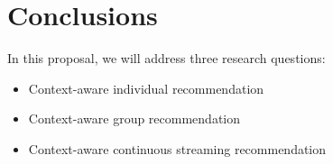 \section{Conclusions}
\begin{frame}{\insertsection}
	In this proposal, we will address three research questions:
	\vspace{1em}
	\begin{itemize}
		\setlength\itemsep{1em}
		\item Context-aware individual recommendation
		\item Context-aware group recommendation
		\item Context-aware continuous streaming recommendation
	\end{itemize}	
\end{frame}
